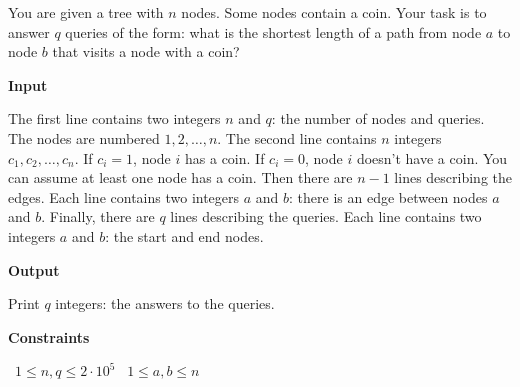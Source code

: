 You are given a tree with $n$ nodes. Some nodes contain a coin.
Your task is to answer $q$ queries of the form: what is the shortest length of a path from node $a$ to node $b$ that visits a node with a coin?

\vspace{0.3cm}\noindent\textbf{Input}

The first line contains two integers $n$ and $q$: the number of nodes and queries. The nodes are numbered $1, 2, \dots, n$.
The second line contains $n$ integers $c_1, c_2,\dots, c_n$. If $c_i = 1$, node $i$ has a coin. If $c_i = 0$, node $i$ doesn't have a coin. You can assume at least one node has a coin.
Then there are $n-1$ lines describing the edges. Each line contains two integers $a$ and $b$: there is an edge between nodes $a$ and $b$.
Finally, there are $q$ lines describing the queries. Each line contains two integers $a$ and $b$: the start and end nodes.

\vspace{0.3cm}\noindent\textbf{Output}

Print $q$ integers: the answers to the queries.

\vspace{0.3cm}\noindent\textbf{Constraints}

\textbullet\ $1 \le n, q \le 2 \cdot 10^5$
\textbullet\ $1 \le a, b \le n$